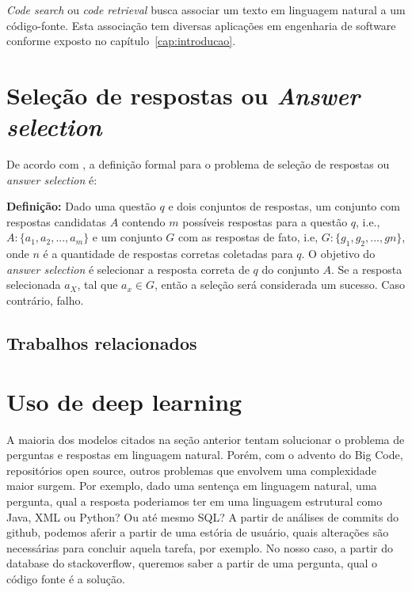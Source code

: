 \textit{Code search} ou \textit{code retrieval} busca associar um texto em linguagem natural a um código-fonte. Esta associação tem diversas aplicações em engenharia de software conforme exposto no capítulo~\ref{cap:introducao}.


\section{Seleção de respostas ou \textit{Answer selection}}
\label{sec:answer-selection}

De acordo com \cite{shao-answer-selection:2019}, a definição formal para o problema de seleção de respostas ou \textit{answer selection} é:

\textbf{Definição:} Dado uma questão $q$ e dois conjuntos de respostas, um conjunto com respostas candidatas $A$ contendo $m$ possíveis respostas para a questão $q$, i.e., $A : \{ a_{1}, a_{2}, . . ., a_{m}\}$ e um conjunto $G$ com as respostas de fato, i.e, $G : \{ g_{1}, g_{2}, . . ., g{n}\}$, onde $n$ é a quantidade de respostas corretas coletadas para $q$. O objetivo do \textit{answer selection} é selecionar a resposta correta de $q$ do conjunto $A$. Se a resposta selecionada $a_{X}$, tal que $a_{x} \in G$, então a seleção será considerada um sucesso. Caso contrário, falho.

\subsection{Trabalhos relacionados}\label{sec:answer-selection-trabalhos-relacionados}

\section{Uso de deep learning}
\label{sec:uso-deep-learning}

A maioria dos modelos citados na seção anterior tentam solucionar o problema de perguntas e respostas em linguagem natural. Porém, com o advento do Big Code, repositórios open source, outros problemas que envolvem uma complexidade maior surgem. Por exemplo, dado uma sentença em linguagem natural, uma pergunta, qual a resposta poderiamos ter em uma linguagem estrutural como Java, XML ou Python? Ou até mesmo SQL? A partir de análises de commits do github, podemos aferir a partir de uma estória de usuário, quais alterações são necessárias para concluir aquela tarefa, por exemplo. No nosso caso, a partir do database do stackoverflow, queremos saber a partir de uma pergunta, qual o código fonte é a solução.